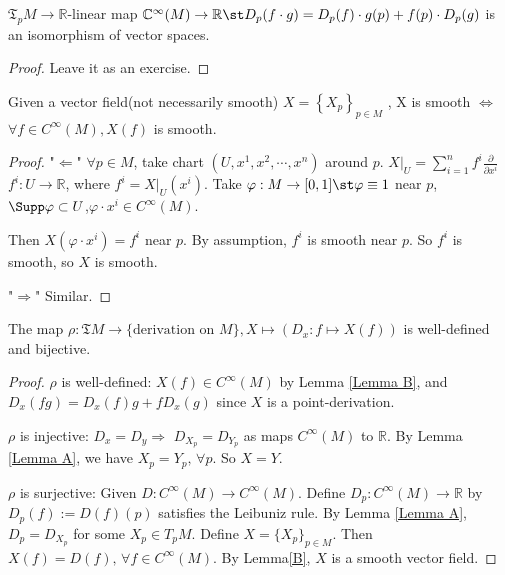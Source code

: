 \begin{lemma}\label{Lemma A}
    $\mathfrak{T}_p{M} \rightarrow \mathbb{R}$-linear map $\mathbb{C}^\infty(M)\rightarrow\mathbb{R} \st D_p(f\cdot g)=D_p(f)\cdot g(p)+f(p)\cdot D_p(g)$ is an isomorphism of vector spaces.
\end{lemma}
\begin{proof}

     Leave it as an exercise.
\end{proof}
\begin{lemma}\label{Lemma B}
    Given a vector field(not necessarily smooth) $X=\left\{X_p\right\}_{p\in M}$ , X is smooth $\Leftrightarrow$ $\forall f \in C^\infty(M),X(f)$ is smooth.
\end{lemma}
\begin{proof}
    "$ \Leftarrow $" $\forall p\in M$, take chart $(U,x^1,x^2,\cdots,x^n)$ around $p$. $X|_U=\sum_{i=1}^{n}{f^i\frac{\partial}{\partial x^i}}$  $f^i:U\rightarrow \mathbb{R}$, where $f^i=X|_U(x^i)$.
    Take $\varphi:M\rightarrow [0,1] \st \varphi \equiv 1 $ near $p$, $\Supp \varphi\subset U$,$\varphi \cdot x^i\in C^\infty(M)$.
    
    Then $X(\varphi \cdot x^i)=f^i$ near $p$. By assumption, $f^i$ is smooth near $p$. So $f^i$ is smooth, so $X$ is smooth.
    
     "$ \Rightarrow $" Similar.
\end{proof}
\begin{theorem}
    The map $\rho:\mathfrak{T}M\rightarrow \{\text{derivation on }M\},X\mapsto (D_x:f\mapsto X(f))$ is well-defined and bijective.
\end{theorem}
\begin{proof}
     $ \rho $ is well-defined: $ X(f)\in C^\infty(M) $ by Lemma \ref{Lemma B}, and  $ D_x(fg)=D_x(f)g+fD_x(g) $ since  $ X $ is a point-derivation.
     
      $ \rho $ is injective: $ D_x=D_y\Rightarrow $ $ D_{X_p}=D_{Y_p} $ as maps  $ C^\infty(M) $ to  $ \mathbb{R} $. By Lemma \ref{Lemma A}, we have  $ X_p=Y_p,\,\forall p $. So  $ X=Y $.  
      
       $ \rho $ is surjective: Given  $ D:C^\infty(M)\rightarrow C^\infty(M) $. Define  $ D_p:C^\infty(M)\rightarrow \mathbb{R} $ by  $ D_p(f):=D(f)(p) $ satisfies the Leibuniz rule. By Lemma \ref{Lemma A},  $ D_p=D_{X_p} $ for some  $ X_p\in T_pM $. Define  $ X=\{X_p\}_{p\in M} $. Then  $ X(f)=D(f) ,\,\forall f\in C^\infty(M)$. By Lemma\ref{B},  $ X $ is a smooth vector field.    
\end{proof}

